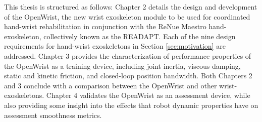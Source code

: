     This thesis is structured as follows: Chapter 2 details the design and development of the OpenWrist, the new wrist exoskeleton module to be used for coordinated hand-wrist rehabilitation in conjunction with the ReNue Maestro hand-exoskeleton, collectively known as the READAPT. Each of the nine design requirements for hand-wrist exoskeletons in Section \ref{sec:motivation} are addressed. Chapter 3 provides the characterization of performance properties of the OpenWrist as a training device, including joint inertia, viscous damping, static and kinetic friction, and closed-loop position bandwidth. Both Chapters 2 and 3 conclude with a comparison between the OpenWrist and other wrist-exoskeletons. Chapter 4 validates the OpenWrist as an assessment device, while also providing some insight into the effects that robot dynamic properties have on assessment smoothness metrics.
